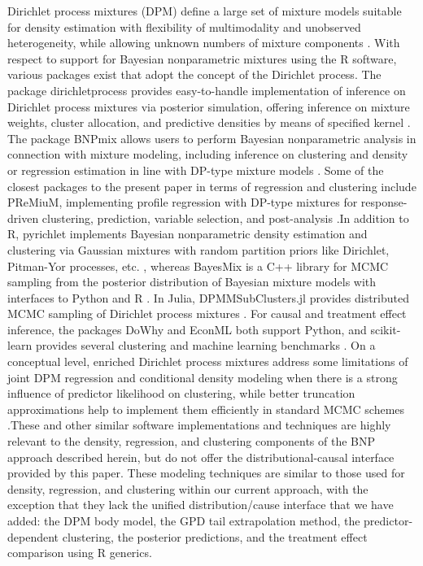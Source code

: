 \documentclass[preprint,12pt,authoryear]{elsarticle}
\newcommand{\pkg}[1]{\textsf{#1}}
\newcommand{\proglang}[1]{\textsf{#1}}
\begin{document}
Dirichlet process mixtures (DPM) define a large set of mixture
models suitable for density estimation with flexibility of multimodality
and unobserved heterogeneity, while allowing unknown numbers of mixture
components \citep{EscobarWest1995}. With respect to support for
Bayesian nonparametric mixtures using the \proglang{R} software, various
packages exist that adopt the concept of the Dirichlet process.
The package \pkg{dirichletprocess}
provides easy-to-handle implementation of inference on Dirichlet process
mixtures via posterior simulation, offering inference on mixture weights,
cluster allocation, and predictive densities by means of specified kernel
\citep{dirichletprocess_pkg}.
The package \pkg{BNPmix}
allows users to perform Bayesian nonparametric analysis in connection with
mixture modeling, including inference on clustering and density or
regression estimation in line with DP-type mixture models
\citep{canale2021BNPmix}.
Some of the closest packages to the present paper in terms of regression
and clustering include \pkg{PReMiuM}, implementing profile regression with
DP-type mixtures for response-driven clustering, prediction, variable
selection, and post-analysis \citep{PReMiuM_pkg}.In addition to \proglang{R}, \pkg{pyrichlet} implements Bayesian nonparametric density estimation and clustering via Gaussian mixtures with random partition priors like Dirichlet, Pitman-Yor processes, etc. \citep{pyrichlet_pkg},
whereas \pkg{BayesMix} is a \proglang{C++} library for MCMC sampling from
the posterior distribution of Bayesian mixture models with interfaces to
\proglang{Python} and \proglang{R} \citep{BayesMix_pkg}. In \proglang{Julia},
\pkg{DPMMSubClusters.jl} provides distributed MCMC sampling of Dirichlet process mixtures \citep{DPMMSubClustersjl_pkg}.
For causal and treatment effect inference, the packages \pkg{DoWhy} and \pkg{EconML} both
support \proglang{Python}, and \pkg{scikit-learn} provides several clustering and machine
learning benchmarks \citep{dowhy_pkg,econml_pkg,scikit_learn}.
On a conceptual level, enriched Dirichlet process mixtures address some limitations of
joint DPM regression and conditional density modeling when there is a strong influence of predictor
likelihood on clustering, while better truncation approximations help to implement them efficiently in standard MCMC schemes \citep{Wade2014EDP,BurnsDaniels2023EDPM}.These and other similar software implementations and techniques are highly relevant to
the density, regression, and clustering components of the BNP approach described herein,
but do not offer the distributional-causal interface provided by this paper.
These modeling techniques are similar to those used for density, regression, and clustering within our current approach,
with the exception that they lack the unified distribution/cause interface
that we have added: the DPM body model, the GPD tail extrapolation method, the predictor-dependent clustering, the posterior predictions, and the treatment effect comparison using \proglang{R} generics.
\end{document}
